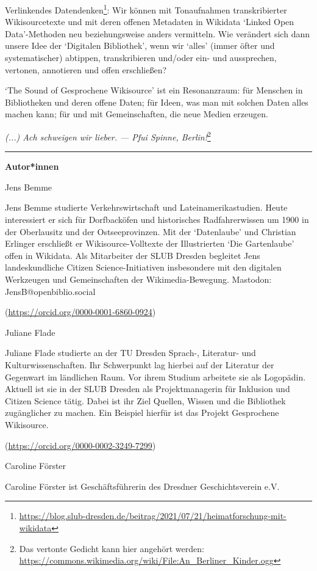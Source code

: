 \documentclass[a4paper,
fontsize=11pt,
oneside,
numbers=noperiodatend,
parskip=half-,
bibliography=totoc,
final
]{scrartcl}
\begin{document}
Verlinkendes Datendenken\footnote{\url{https://blog.slub-dresden.de/beitrag/2021/07/21/heimatforschung-mit-wikidata}}:
Wir können mit Tonaufnahmen transkribierter Wikisourcetexte und mit
deren offenen Metadaten in Wikidata \enquote*{Linked Open Data}-Methoden
neu beziehungsweise anders vermitteln. Wie verändert sich dann unsere
Idee der \enquote*{Digitalen Bibliothek}, wenn wir \enquote*{alles}
(immer öfter und systematischer) abtippen, transkribieren und/oder ein-
und aussprechen, vertonen, annotieren und offen erschließen?

\enquote*{The Sound of Gesprochene Wikisource} ist ein Resonanzraum: für
Menschen in Bibliotheken und deren offene Daten; für Ideen, was man mit
solchen Daten alles machen kann; für und mit Gemeinschaften, die neue
Medien erzeugen.

\begin{center}
\emph{(...) Ach schweigen wir lieber. --- Pfui Spinne, Berlin!}\footnote{Das vertonte Gedicht kann hier angehört werden: \url{https://commons.wikimedia.org/wiki/File:An\_Berliner\_Kinder.ogg}}
\end{center}

\begin{center}\rule{0.5\linewidth}{0.5pt}\end{center}

\textbf{Autor*innen}

Jens Bemme

Jens Bemme studierte Verkehrswirtschaft und Lateinamerikastudien. Heute interessiert er sich für Dorfbacköfen 
und historisches Radfahrerwissen um 1900 in der Oberlausitz und der Ostseeprovinzen. Mit der ‘Datenlaube’ und 
Christian Erlinger erschließt er Wikisource-Volltexte der Illustrierten ‘Die Gartenlaube’ offen in Wikidata. 
Als Mitarbeiter der SLUB Dresden begleitet Jens landeskundliche Citizen Science-Initiativen insbesondere mit 
den digitalen Werkzeugen und Gemeinschaften der Wikimedia-Bewegung. Mastodon: JensB@openbiblio.social

(\url{https://orcid.org/0000-0001-6860-0924})

Juliane Flade

Juliane Flade studierte an der TU Dresden Sprach-, Literatur- und Kulturwissenschaften. Ihr Schwerpunkt lag hierbei 
auf der Literatur der Gegenwart im ländlichen Raum. Vor ihrem Studium arbeitete sie als Logopädin. Aktuell ist sie 
in der SLUB Dresden als Projektmanagerin für Inklusion und Citizen Science tätig. Dabei ist ihr Ziel Quellen, Wissen 
und die Bibliothek zugänglicher zu machen. Ein Beispiel hierfür ist das Projekt Gesprochene Wikisource.

(\url{https://orcid.org/0000-0002-3249-7299})

Caroline Förster

Caroline Förster ist Geschäftsführerin des Dresdner Geschichtsverein e.V.
\end{document}
